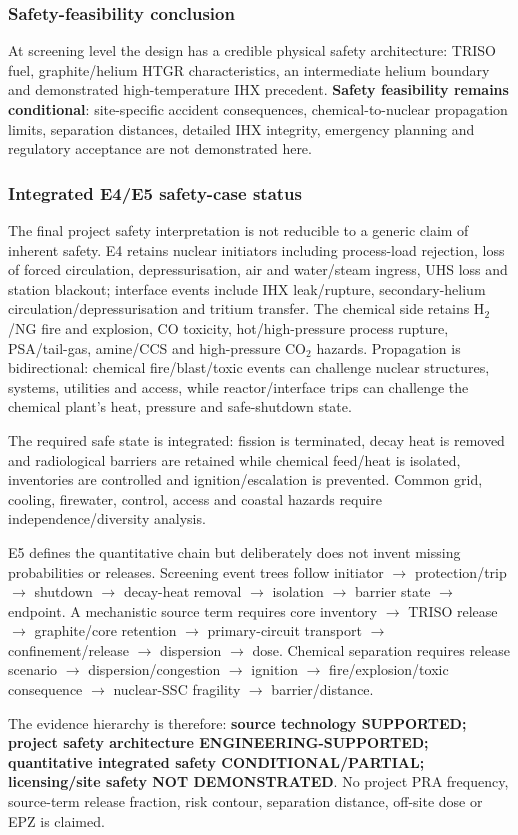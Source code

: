 \subsubsection{Safety-feasibility conclusion}
At screening level the design has a credible physical safety architecture: TRISO fuel, graphite/helium HTGR characteristics, an intermediate helium boundary and demonstrated high-temperature IHX precedent. \textbf{Safety feasibility remains conditional}: site-specific accident consequences, chemical-to-nuclear propagation limits, separation distances, detailed IHX integrity, emergency planning and regulatory acceptance are not demonstrated here.
\subsubsection{Integrated E4/E5 safety-case status}
The final project safety interpretation is not reducible to a generic claim of inherent safety. E4 retains nuclear initiators including process-load rejection, loss of forced circulation, depressurisation, air and water/steam ingress, UHS loss and station blackout; interface events include IHX leak/rupture, secondary-helium circulation/depressurisation and tritium transfer. The chemical side retains H$_2$/NG fire and explosion, CO toxicity, hot/high-pressure process rupture, PSA/tail-gas, amine/CCS and high-pressure CO$_2$ hazards. Propagation is bidirectional: chemical fire/blast/toxic events can challenge nuclear structures, systems, utilities and access, while reactor/interface trips can challenge the chemical plant's heat, pressure and safe-shutdown state.

The required safe state is integrated: fission is terminated, decay heat is removed and radiological barriers are retained while chemical feed/heat is isolated, inventories are controlled and ignition/escalation is prevented. Common grid, cooling, firewater, control, access and coastal hazards require independence/diversity analysis.

E5 defines the quantitative chain but deliberately does not invent missing probabilities or releases. Screening event trees follow initiator $\rightarrow$ protection/trip $\rightarrow$ shutdown $\rightarrow$ decay-heat removal $\rightarrow$ isolation $\rightarrow$ barrier state $\rightarrow$ endpoint. A mechanistic source term requires core inventory $\rightarrow$ TRISO release $\rightarrow$ graphite/core retention $\rightarrow$ primary-circuit transport $\rightarrow$ confinement/release $\rightarrow$ dispersion $\rightarrow$ dose. Chemical separation requires release scenario $\rightarrow$ dispersion/congestion $\rightarrow$ ignition $\rightarrow$ fire/explosion/toxic consequence $\rightarrow$ nuclear-SSC fragility $\rightarrow$ barrier/distance.

The evidence hierarchy is therefore: \textbf{source technology SUPPORTED; project safety architecture ENGINEERING-SUPPORTED; quantitative integrated safety CONDITIONAL/PARTIAL; licensing/site safety NOT DEMONSTRATED}. No project PRA frequency, source-term release fraction, risk contour, separation distance, off-site dose or EPZ is claimed.
